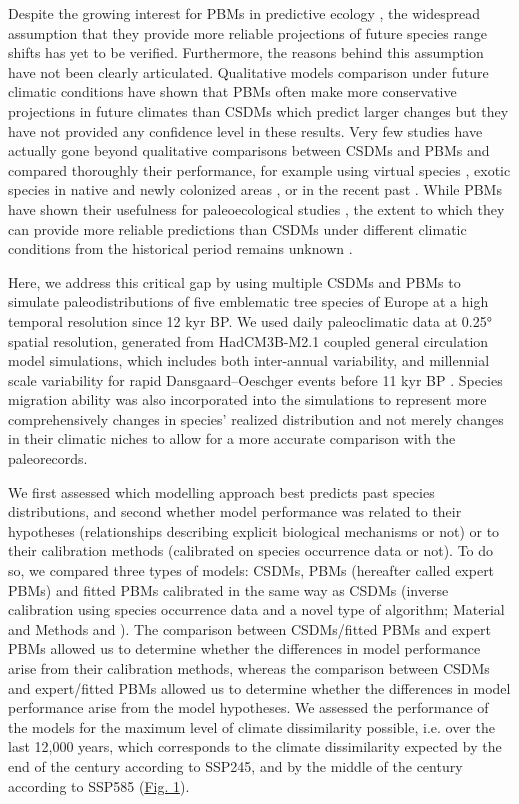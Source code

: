 \documentclass[9pt,twocolumn,twoside]{pnas-new}
\begin{document}
Despite the growing interest for PBMs in predictive ecology \cite{Connolly2017, Urban2016, Pilowsky2022}, the widespread assumption that they provide more reliable projections of future species range shifts has yet to be verified. Furthermore,  the reasons behind this assumption have not been clearly articulated. Qualitative models comparison under future climatic conditions have shown that PBMs often make more conservative projections in future climates than CSDMs which predict larger changes \cite{Morin2009, Cheaib2012, Gritti2013} but they have not provided any confidence level in these results. Very few studies have actually gone beyond qualitative comparisons between CSDMs and PBMs and compared thoroughly their performance, for example using virtual species \cite{Zurell2016}, exotic species in native and newly colonized areas \cite{Higgins2020}, or in the recent past \cite{Fordham2018}. 
While PBMs have shown their usefulness for paleoecological studies \cite{Saltre2013, Ruosch2016, Schwoerer2014}, the extent to which they can provide more reliable predictions than CSDMs under different climatic conditions from the historical period remains unknown \cite{UribeRivera2023, Briscoe2019}. 

Here, we address this critical gap by using multiple CSDMs and PBMs to simulate paleodistributions of five emblematic tree species of Europe at a high temporal resolution since 12 kyr BP. We used daily paleoclimatic data at 0.25° spatial resolution, generated from HadCM3B-M2.1 coupled general circulation model simulations, which includes both inter-annual variability, and millennial scale variability for rapid Dansgaard–Oeschger events before 11 kyr BP \cite{Armstrong2019}. Species migration ability was also incorporated into the simulations to represent more comprehensively changes in species' realized distribution and not merely changes in their climatic niches to allow for a more  accurate comparison with the paleorecords.

We first assessed which modelling approach best predicts past species distributions, and second whether model performance was related to their hypotheses (relationships describing explicit biological mechanisms or not) or to their calibration methods (calibrated on species occurrence data or not). To do so, we compared three types of models: CSDMs, PBMs (hereafter called expert PBMs) and fitted PBMs calibrated in the same way as CSDMs (inverse calibration using species occurrence data and a novel type of algorithm; Material and Methods and \cite{VanderMeersch2023}). The comparison between CSDMs/fitted PBMs and expert PBMs allowed us to determine whether the differences in model performance arise from their calibration methods, whereas the comparison between CSDMs and expert/fitted PBMs allowed us to determine whether the differences in model performance arise from the model hypotheses. We assessed the performance of the models for the maximum level of climate dissimilarity possible, i.e. over the last 12,000 years, which corresponds to the climate dissimilarity expected by the end of the century according to SSP245, and by the middle of the century according to SSP585 (\hyperref[fig:climaticdissimilarity]{Fig. 1}).
\end{document}
